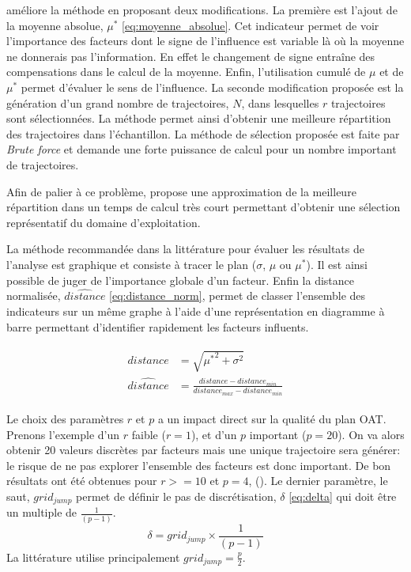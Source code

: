 \cite{Campolongo20071509} améliore la méthode en proposant deux modifications. La première
est l’ajout de la moyenne absolue, $\mu^{*}$ \eqref{eq:moyenne_absolue}. Cet indicateur permet
de voir l’importance des facteurs dont le signe de l’influence est variable là où
la moyenne ne donnerais pas l’information. En effet le changement de signe
entraîne des compensations dans le calcul de la moyenne.
Enfin, l’utilisation cumulé de $\mu$ et de $\mu^{*}$ permet d’évaluer le sens de
l’influence.
La seconde modification proposée est la génération d’un grand nombre de trajectoires, $N$,
dans lesquelles $r$ trajectoires sont sélectionnées. La méthode permet ainsi
d’obtenir une meilleure répartition des trajectoires dans l’échantillon.
La méthode de sélection proposée est faite par \emph{Brute force} et demande une forte puissance
de calcul pour un nombre important de trajectoires.

Afin de palier à ce problème, \cite{Ruano2012103} propose une approximation de
la meilleure répartition dans un temps de calcul très court permettant d’obtenir
une sélection représentatif du domaine d’exploitation.

La méthode recommandée dans la littérature pour évaluer les résultats de l’analyse
est graphique et consiste à tracer le plan ($\sigma$, $\mu$ ou $\mu^{*}$). Il est
ainsi possible de juger de l’importance globale d’un facteur.
Enfin la distance normalisée, $\hat{distance}$ \eqref{eq:distance_norm}, permet
de classer l’ensemble des indicateurs sur un même graphe à l’aide d’une représentation
en diagramme à barre permettant d’identifier rapidement les facteurs influents.

\begin{align}\label{eq:distance_norm}
    \begin{split}
        distance        &= \sqrt{{\mu^{*}}^2 + \sigma^{2}} \\
        \hat{distance}  &=  \frac{distance - distance_{min}}{distance_{max} - distance_{min}}
    \end{split}
\end{align}

Le choix des paramètres $r$ et $p$ a un impact direct sur la qualité du plan OAT.
Prenons l’exemple d’un $r$ faible ($r=1$), et d’un $p$ important ($p=20$).
On va alors obtenir 20 valeurs discrètes par facteurs mais une unique trajectoire
sera générer: le risque de ne pas explorer l’ensemble des facteurs est donc important.
De bon résultats ont été obtenues pour $r >= 10$ et $p = 4$, (\cite{Campolongo199975,Campolongo2000377,Campolongo199749}).
Le dernier paramètre, le saut, $grid_{jump}$ permet de définir le pas de discrétisation, $\delta$ \eqref{eq:delta}
qui doit être un multiple de $\frac{1}{(p - 1)}$.
\begin{equation}\label{eq:delta}
  \delta = grid_{jump} \times \frac{1}{(p - 1)}
\end{equation}
La littérature utilise principalement $grid_{jump} = \frac{p}{2}$.

